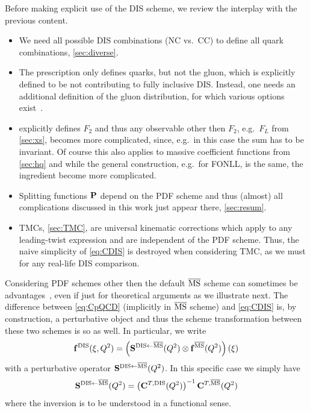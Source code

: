 Before making explicit use of the DIS scheme, we review the interplay with the previous content.
\begin{itemize}
    \item We need all possible DIS combinations (NC vs.\ CC) to define all quark combinations, \cref{sec:diverse}.
    \item The prescription only defines quarks, but not the gluon, which is explicitly defined to be not contributing to fully inclusive DIS.
        Instead, one needs an additional definition of the gluon distribution, for which various options exist~\cite{Diemoz:1987xu,Soar:2009yh,Altarelli:1998gn,Candido:2023ujx}.
    \item {} explicitly defines $F_2$ and thus any observable other then $F_2$, e.g.\ $F_L$ from \cref{sec:xs}, becomes more complicated, since, e.g.\ in this case the sum has to be invariant.
        Of course this also applies to massive coefficient functions from \cref{sec:hq} and while the general construction, e.g.\ for FONLL, is the same, the ingredient become more complicated.
    \item Splitting functions $\vb P$ depend on the PDF scheme and thus (almost) all complications discussed in this work just appear there, \cref{sec:resum}.
    \item TMCs, \cref{sec:TMC}, are universal kinematic corrections which apply to any leading-twist expression and are independent of the PDF scheme.
        Thus, the naive simplicity of \cref{eq:CDIS} is destroyed when considering TMC, as we must for any real-life DIS comparison.
\end{itemize}

Considering PDF schemes other then the default $\overline{\mathrm{MS}}$ scheme can sometimes be advantages~\cite{Delorme:2026vln}, even if just for theoretical arguments as we illustrate next.
The difference between \cref{eq:CpQCD} (implicitly in $\overline{\mathrm{MS}}$ scheme) and \cref{eq:CDIS} is, by construction, a perturbative object and thus the scheme transformation between these two schemes is so as well.
In particular, we write
\begin{equation}
    \vb f^{\mathrm{DIS}}(\xi,Q^2) = \left(\vb S^{\mathrm{DIS}\leftarrow\overline{\mathrm{MS}}}(Q^2) \otimes \vb f^{\overline{\mathrm{MS}}}(Q^2)\right)(\xi)
\end{equation}
with a perturbative operator $\vb S^{\mathrm{DIS}\leftarrow\overline{\mathrm{MS}}}(Q^2)$.
In this specific case we simply have
\begin{equation}
    \vb S^{\mathrm{DIS}\leftarrow\overline{\mathrm{MS}}}(Q^2) = \left(\vb C^{T,\mathrm{DIS}}(Q^2)\right)^{-1} \vb C^{T,\overline{\mathrm{MS}}}(Q^2) \label{eq:DIStrafo}
\end{equation}
where the inversion is to be understood in a functional sense.

